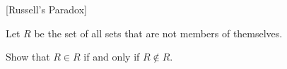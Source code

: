 \documentclass[11pt, a4paper, oneside]{exam}
\theoremstyle{definition}\newtheorem{define}{Definition}[section]
\theoremstyle{remark}\newtheorem{remark}{Remark}
\theoremstyle{definition}\newtheorem{example}{Example}[subsection]
\theoremstyle{definition}\newtheorem{notation}{Notation}[section]
\theoremstyle{definition}\newtheorem{theorem}{Theorem}[section]
\theoremstyle{definition}\newtheorem{corollary}{Corollary}[section]
\begin{document}
\begin{questions}

\question[2]

[Russell's Paradox]

Let $R$ be the set of all sets that are not members of themselves.

Show that $R\in R$ if and only if $R \not\in R$.





\end{questions}
\end{document}
